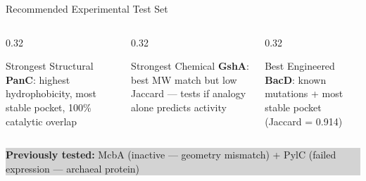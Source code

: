 \documentclass[aspectratio=169, 11pt]{beamer}
\begin{document}
\begin{frame}{Recommended Experimental Test Set}
\vspace{4pt}
\begin{columns}[T]
\begin{column}{0.32\textwidth}
\begin{exampleblock}{\small Strongest Structural}
\centering\small
\textbf{PanC}: highest hydrophobicity, most stable pocket, 100\% catalytic overlap
\end{exampleblock}
\end{column}
\begin{column}{0.32\textwidth}
\begin{alertblock}{\small Strongest Chemical}
\centering\small
\textbf{GshA}: best MW match but low Jaccard --- tests if analogy alone predicts activity
\end{alertblock}
\end{column}
\begin{column}{0.32\textwidth}
\begin{block}{\small Best Engineered}
\centering\small
\textbf{BacD}: known mutations + most stable pocket (Jaccard = 0.914)
\end{block}
\end{column}
\end{columns}

\vspace{2pt}
\colorbox{lightgray}{\parbox{0.94\textwidth}{\centering\small
\textbf{Previously tested:} McbA (inactive --- geometry mismatch) + PylC (failed expression --- archaeal protein)
}}
\end{frame}
\end{document}
